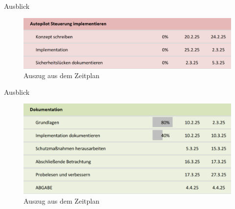 \documentclass[usenames, dvipsnames, aspectratio=75]{beamer}
\begin{document}
\begin{frame}{Ausblick}
    \begin{figure}
        \centering
        \includegraphics[width=1\linewidth]{assets/zeitplan2.png}
        \caption{Auszug aus dem Zeitplan}
    \end{figure}
\end{frame}

\begin{frame}{Ausblick}
    \begin{figure}
        \centering
        \includegraphics[width=1\linewidth]{assets/zeitplan3.png}
        \caption{Auszug aus dem Zeitplan}
    \end{figure}
\end{frame}

\end{document}
